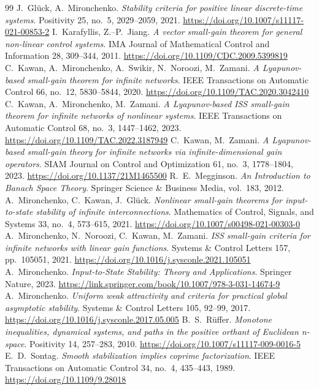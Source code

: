 \documentclass[10pt, oneside, a4paper]{article}
\begin{document}
\begin{thebibliography}{99}
 J.~Gl{\"u}ck, A.~Mironchenko. \emph{Stability criteria for positive linear discrete-time systems}. Positivity 25, no.~5, 2029--2059, 2021. \url{https://doi.org/10.1007/s11117-021-00853-2}%
 I.~Karafyllis, Z.--P.~Jiang. \emph{A vector small-gain theorem for general non-linear control systems}. IMA Journal of Mathematical Control and Information 28, 309--344, 2011. \url{https://doi.org/10.1109/CDC.2009.5399819}%
 C.~Kawan, A.~Mironchenko, A.~Swikir, N.~Noroozi, M.~Zamani. \emph{A Lyapunov-based small-gain theorem for infinite networks}. IEEE Transactions on Automatic Control 66, no.~12, 5830--5844, 2020. \url{https://doi.org/10.1109/TAC.2020.3042410}%
 C.~Kawan, A.~Mironchenko, M.~Zamani. \emph{A Lyapunov-based ISS small-gain theorem for infinite networks of nonlinear systems}. IEEE Transactions on Automatic Control 68, no.~3, 1447--1462, 2023. \url{https://doi.org/10.1109/TAC.2022.3187949}%
 C.~Kawan, M.~Zamani. \emph{A Lyapunov-based small-gain theory for infinite networks via infinite-dimensional gain operators}. SIAM Journal on Control and Optimization 61, no.~3, 1778--1804, 2023. \url{https://doi.org/10.1137/21M1465500}%
 R.~E.~Megginson. \emph{An Introduction to Banach Space Theory}. Springer Science \& Business Media, vol.~183, 2012.%
 A.~Mironchenko, C.~Kawan, J.~Gl{\"u}ck. \emph{Nonlinear small-gain theorems for input-to-state stability of infinite interconnections}. Mathematics of Control, Signals, and Systems 33, no.~4, 573--615, 2021. \url{https://doi.org/10.1007/s00498-021-00303-0}%
 A.~Mironchenko, N.~Noroozi, C.~Kawan, M.~Zamani. \emph{ISS small-gain criteria for infinite networks with linear gain functions}. Systems \& Control Letters 157, pp.~105051, 2021. \url{https://doi.org/10.1016/j.sysconle.2021.105051}%
 A.~Mironchenko. \emph{Input-to-State Stability: Theory and Applications}. Springer Nature, 2023. \url{https://link.springer.com/book/10.1007/978-3-031-14674-9}%
 A.~Mironchenko. \emph{Uniform weak attractivity and criteria for practical global asymptotic stability}. Systems \& Control Letters 105, 92--99, 2017. \url{https://doi.org/10.1016/j.sysconle.2017.05.005}%
 B.~S.~R{\"u}ffer. \emph{Monotone inequalities, dynamical systems, and paths in the positive orthant of Euclidean n-space}. Positivity 14, 257--283, 2010. \url{https://doi.org/10.1007/s11117-009-0016-5}%
 E.~D.~Sontag. \emph{Smooth stabilization implies coprime factorization}. IEEE Transactions on Automatic Control 34, no.~4, 435--443, 1989. \url{https://doi.org/10.1109/9.28018}%
\end{thebibliography}
\end{document}
